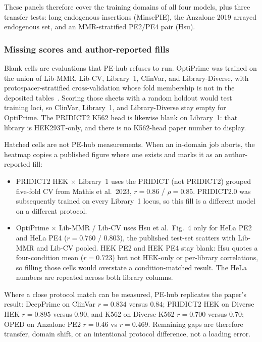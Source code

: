 \documentclass{article}
\begin{document}
These panels therefore cover the training domains of all four models, plus three transfer tests: long endogenous insertions (MinsePIE), the Anzalone 2019 arrayed endogenous set, and an MMR-stratified PE2/PE4 pair (Hsu).

\subsubsection{Missing scores and author-reported fills}

Blank cells are evaluations that PE-hub refuses to run. OptiPrime was trained on the union of Lib-MMR, Lib-CV, Library~1, ClinVar, and Library-Diverse, with protospacer-stratified cross-validation whose fold membership is not in the deposited tables~\cite{hsuMechanisticMachineLearning2026}. Scoring those sheets with a random holdout would test training loci, so ClinVar, Library~1, and Library-Diverse stay empty for OptiPrime. The PRIDICT2 K562 head is likewise blank on Library~1: that library is HEK293T-only, and there is no K562-head paper number to display.

Hatched cells are not PE-hub measurements. When an in-domain job aborts, the heatmap copies a published figure where one exists and marks it as an author-reported fill:

\begin{itemize}
    \item PRIDICT2 HEK $\times$ Library~1 uses the PRIDICT (not PRIDICT2) grouped five-fold CV from Mathis et al.\ 2023, $r = 0.86$ / $\rho = 0.85$\cite{schwankgeraldPredictingPrimeEditing2023}. PRIDICT2.0 was subsequently trained on every Library~1 locus, so this fill is a different model on a different protocol.
    \item OptiPrime $\times$ Lib-MMR / Lib-CV uses Hsu et al.\ Fig.~4 only for HeLa PE2 and HeLa PE4 ($r = 0.760$ / $0.803$), the published test-set scatters with Lib-MMR and Lib-CV pooled. HEK PE2 and HEK PE4 stay blank: Hsu quotes a four-condition mean ($r = 0.723$) but not HEK-only or per-library correlations, so filling those cells would overstate a condition-matched result\cite{hsuMechanisticMachineLearning2026}. The HeLa numbers are repeated across both library columns.
\end{itemize}

Where a close protocol match can be measured, PE-hub replicates the paper's result: DeepPrime on ClinVar $r = 0.834$ versus $0.84$\cite{yuPredictionEfficienciesDiverse2023}; PRIDICT2 HEK on Diverse HEK $r = 0.895$ versus $0.90$, and K562 on Diverse K562 $r = 0.700$ versus $0.70$\cite{mathisMachineLearningPrediction2024}; OPED on Anzalone PE2 $r = 0.46$ vs $r = 0.469$. Remaining gaps are therefore transfer, domain shift, or an intentional protocol difference, not a loading error.
\end{document}
